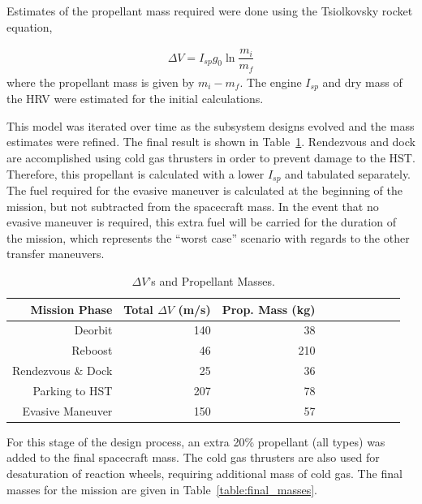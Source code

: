 \documentclass[paper=letter, fontsize=11pt]{scrartcl} %
\numberwithin{equation}{section} %
\numberwithin{figure}{section} %
\numberwithin{table}{section} %
\begin{document}
Estimates of the propellant mass required were done using the Tsiolkovsky rocket equation,

\begin{align*}
    \Delta V = I_{sp} g_0 \ln \dfrac{m_i}{m_f}
\end{align*}
where the propellant mass is given by $m_i-m_f$. The engine $I_{sp}$ and dry mass of the HRV were estimated for the initial calculations.

This model was iterated over time as the subsystem designs evolved and the mass estimates were refined. The final result is shown in Table~\ref{table:delta_vs}. Rendezvous and dock are accomplished using cold gas thrusters in order to prevent damage to the HST. Therefore, this propellant is calculated with a lower $I_{sp}$ and tabulated separately. The fuel required for the evasive maneuver is calculated at the beginning of the mission, but not subtracted from the spacecraft mass. In the event that no evasive maneuver is required, this extra fuel will be carried for the duration of the mission, which represents the ``worst case'' scenario with regards to the other transfer maneuvers.

\begin{table}[H]
    \begin{center}
        \begin{tabular}{rrrrrrrrrr}
            \toprule
            Mission Phase      & Total $\Delta V$ (m/s) & Prop. Mass (kg) \\
            \midrule
            Deorbit            & 140                    & 38              \\
            Reboost            & 46                     & 210             \\
            Rendezvous \& Dock & 25                     & 36              \\
            Parking to HST     & 207                    & 78              \\
            Evasive Maneuver   & 150                    & 57              \\
            \bottomrule
        \end{tabular}
    \end{center}
    \caption{$\Delta V$'s and Propellant Masses.}
    \label{table:delta_vs}
\end{table}


For this stage of the design process, an extra 20\% propellant (all types) was added to the final spacecraft mass. The cold gas thrusters are also used for desaturation of reaction wheels, requiring additional mass of cold gas. The final masses for the mission are given in Table~\ref{table:final_masses}.
\end{document}
